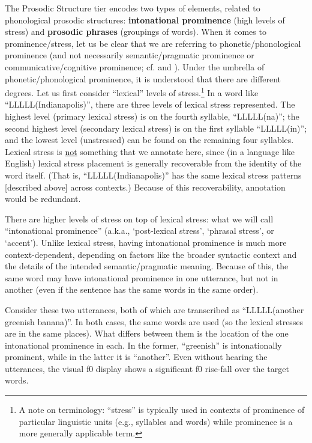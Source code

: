\documentclass[11pt, twoside]{memoir}
\begin{document}
The Prosodic Structure tier encodes two types of elements, related to phonological prosodic structures: \textbf{intonational prominence} (high levels of stress) and \textbf{prosodic phrases} (groupings of words). When it comes to prominence\slash stress, let us be clear that we are referring to phonetic\slash phonological prominence (and not necessarily semantic\slash pragmatic prominence or communicative\slash cognitive prominence; cf. \citealt{gussenhoven15} and \citealt{wagner-15}). Under the umbrella of phonetic\slash phonological prominence, it is understood that there are different degrees. Let us first consider “lexical” levels of stress.\footnote{A note on terminology: “stress” is typically used in contexts of prominence of particular linguistic units (e.g., syllables and words) while prominence is a more generally applicable term.} In a word like “LLLLL(Indianapolis)”, there are three levels of lexical stress represented. The highest level (primary lexical stress) is on the fourth syllable, “LLLLL(na)”; the second highest level (secondary lexical stress) is on the first syllable “LLLLL(in)”; and the lowest level (unstressed) can be found on the remaining four syllables. Lexical stress is \uline{not} something that we annotate here, since (in a language like English) lexical stress placement is generally recoverable from the identity of the word itself. (That is, “LLLLL(Indianapolis)” has the same lexical stress patterns [described above] across contexts.) Because of this recoverability, annotation would be redundant.

There are higher levels of stress on top of lexical stress: what we will call “intonational prominence” (a.k.a., ‘post-lexical stress’, ‘phrasal stress’, or ‘accent’). Unlike lexical stress, having intonational prominence is much more context-dependent, depending on factors like the broader syntactic context and the details of the intended semantic\slash pragmatic meaning. Because of this, the same word may have intonational prominence in one utterance, but not in another (even if the sentence has the same words in the same order).

Consider these two utterances, both of which are transcribed as “LLLLL(another greenish banana)”. In both cases, the same words are used (so the lexical stresses are in the same places). What differs between them is the location of the one intonational prominence in each. In the former, “greenish” is intonationally prominent, while in the latter it is “another”. Even without hearing the utterances, the visual f0 display shows a significant f0 rise-fall over the target words. 
\end{document}
